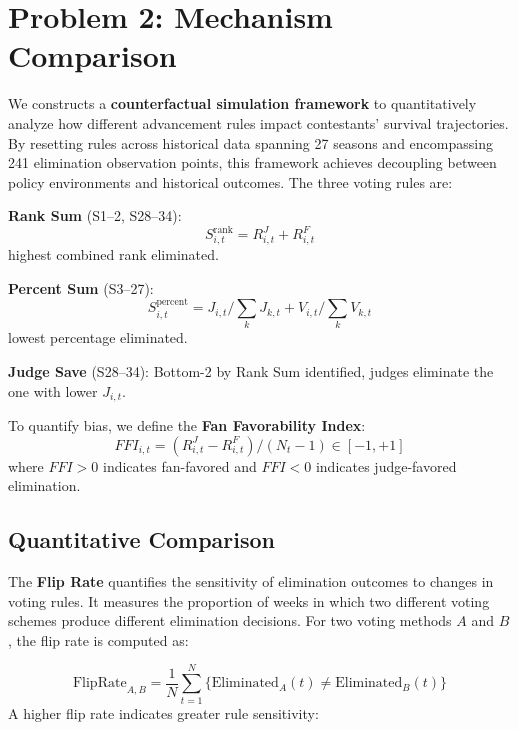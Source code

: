 \documentclass{mcmthesis}
\begin{document}

\section{Problem 2: Mechanism Comparison}

We constructs a \textbf{counterfactual simulation framework} to quantitatively analyze how different advancement rules impact contestants' survival trajectories. By resetting rules across historical data spanning 27 seasons and encompassing 241 elimination observation points, this framework achieves decoupling between policy environments and historical outcomes. 
The three voting rules are:

\textbf{Rank Sum} (S1--2, S28--34): 
\begin{equation}
S^{\text{rank}}_{i,t} = R^{J}_{i,t} + R^{F}_{i,t}
\end{equation}
highest combined rank eliminated.

\textbf{Percent Sum} (S3--27):  
\begin{equation}
S^{\text{percent}}_{i,t} = J_{i,t}/\sum_k J_{k,t} + V_{i,t}/\sum_k V_{k,t}
\end{equation}
lowest percentage eliminated.

\textbf{Judge Save} (S28--34): Bottom-2 by Rank Sum identified, judges eliminate the one with lower $J_{i,t}$.

To quantify bias, we define the \textbf{Fan Favorability Index}:
\begin{equation}
FFI_{i,t} = (R^{J}_{i,t} - R^{F}_{i,t})/(N_t - 1) \in [-1, +1]
\end{equation}
where $FFI > 0$ indicates fan-favored and $FFI < 0$ indicates judge-favored elimination.

\subsection{Quantitative Comparison}

The \textbf{Flip Rate} quantifies the sensitivity of elimination outcomes to changes in voting rules. It measures the proportion of weeks in which two different voting schemes produce different elimination decisions. For two voting methods $A$ and $B$, the flip rate is computed as:

\begin{equation}
\text{FlipRate}_{A,B} = \frac{1}{N} \sum_{t=1}^{N} \{\text{Eliminated}_A(t) \neq \text{Eliminated}_B(t)\}
\end{equation}
A higher flip rate indicates greater rule sensitivity:
\end{document}
